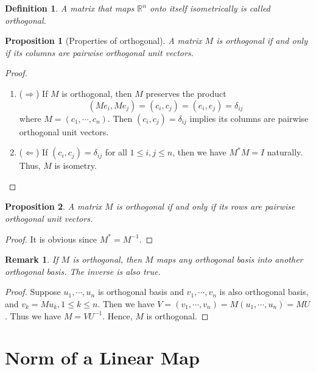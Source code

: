 \documentclass[11pt]{book}
\newtheorem{definition}{Definition}[section]
\newtheorem{proposition}{Proposition}[section]
\newtheorem{remark}{Remark}[section]
\theoremstyle{definition}
\numberwithin{equation}{chapter}
\begin{document}
\medskip

\begin{definition}
A matrix that maps $\mathbb{R}^n$ onto itself isometrically is called orthogonal.
\end{definition}

\medskip

\begin{proposition}[Properties of orthogonal]
A matrix $M$ is orthogonal if and only if its columns are pairwise orthogonal unit vectors.
\end{proposition}
\begin{proof}
~\begin{enumerate}[label=(\arabic*)]
    \item ($\Rightarrow$) If $M$ is orthogonal, then $M$ preserves the product $$(Me_i, Me_j) = (c_i, c_j) = (e_i,e_j) = \delta_{ij}$$ 
    where $M = (c_1,\cdots,c_n)$. Then $(c_i, c_j) = \delta_{ij}$ implies its columns are pairwise orthogonal unit vectors.
    \item ($\Leftarrow$) If $(c_i, c_j) = \delta_{ij}$ for all $1\leq i, j\leq n$, then we have $M^* M = I$ naturally. Thus, $M$ is isometry.
\end{enumerate}
\end{proof}

\medskip

\begin{proposition}
A matrix $M$ is orthogonal if and only if its rows are pairwise orthogonal unit vectors.
\end{proposition}
\begin{proof}
It is obvious since $M^* = M^{-1}$.
\end{proof}

\begin{remark}
If $M$ is orthogonal, then $M$ maps any orthogonal basis into another orthogonal basis. The inverse is also true.
\end{remark}
\begin{proof}
Suppose $u_1,\cdots,u_n$ is orthogonal basis and $v_1,\cdots,v_n$ is also orthogonal basis, and $v_k = Mu_k, 1\leq k \leq n$. Then we have
$V = (v_1,\cdots,v_n) = M (u_1,\cdots,u_n) = MU$. Thus we have $M = VU^{-1}$. Hence, $M$ is orthogonal.
\end{proof}

\medskip

\section{Norm of a Linear Map}
\end{document}
